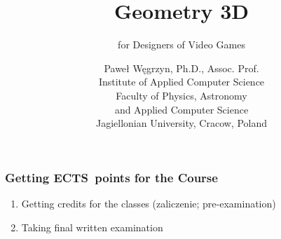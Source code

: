 \documentclass[10pt,t]{beamer}
\title{Geometry 3D}
\subtitle{for Designers of Video Games}
\author{Paweł Węgrzyn, Ph.D., Assoc. Prof. \\[1em]
  Institute of Applied Computer Science \\
  Faculty of Physics, Astronomy \\
  and Applied Computer Science \\
  Jagiellonian University, Cracow, Poland}
\date{}
\begin{document}





\RaggedRight





\maketitle





















\begin{frame}
  \frametitle{Getting ECTS~points for the Course}


  \begin{enumerate}
    \setlength{\itemsep}{1em}

  \item Getting credits for the classes (zaliczenie; pre-examination)

  \item Taking final written examination

  \end{enumerate}

\end{frame}





\end{document}
